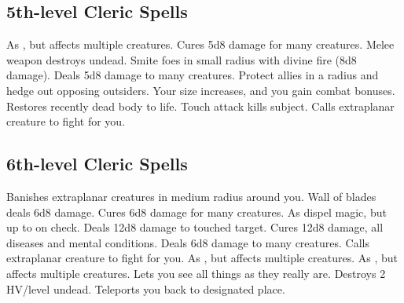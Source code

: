 \subsection{5th-level Cleric Spells}
\begin{spelllist}
 As , but affects multiple creatures.
 Cures 5d8 damage for many creatures.
 Melee weapon destroys undead.
 Smite foes in small radius with divine fire (8d8 damage).
 Deals 5d8 damage to many creatures.
 Protect allies in a \areamed radius and hedge out opposing outsiders.
 Your size increases, and you gain combat bonuses.
 Restores recently dead body to life.
 Touch attack kills subject.
 Calls extraplanar creature to fight for you.
\end{spelllist}

\subsection{6th-level Cleric Spells}
\begin{spelllist}
 Banishes extraplanar creatures in medium radius around you.
 Wall of blades deals 6d8 damage.
 Cures 6d8 damage for many creatures.
 As dispel magic, but up to  on check.
 Deals 12d8 damage to touched target.
 Cures 12d8 damage, all diseases and mental conditions.
 Deals 6d8 damage to many creatures.
 Calls extraplanar creature to fight for you.
 As , but affects multiple creatures.
 As , but affects multiple creatures.
\M Lets you see all things as they really are.
\M Destroys 2 HV/level undead.
 Teleports you back to designated place.
\end{spelllist}

